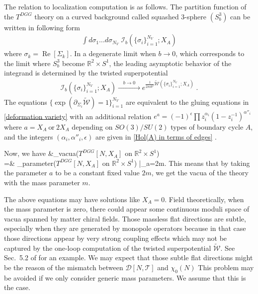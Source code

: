 \documentclass[a4paper,11pt]{article}
\def\cT{\mathcal{T}}
\def\cD{\mathcal{D}}
\def\Re{\mathop{\mathrm{Re}}}
\def\beq#1\eeq{\begin{align}#1\end{align}}
\def\alert#1{{\color{red}[#1]}}
\begin{document}
The relation to localization computation is as follows. The partition function of the $T^{DGG}$ theory on a curved background called squashed 3-sphere 
$(S^3_b)$ can be written in  following form \cite{Hama:2011ea,Dimofte:2011ju}
%
\begin{align}
\int d\sigma_1 \ldots d\sigma_{N_V} \;\mathcal{I}_b( \{\sigma_i\}_{i=1}^{N_V}  ;X_A) 
\end{align}
%
where $\sigma_k = \Re[\Sigma_k]$.
In a degenerate limit when $b\rightarrow 0$, which corresponds to the limit where $S^3_b$ become $\mathbb{R}^2 \times S^1$, the leading asymptotic behavior of the integrand is determined by the twisted superpotential 
%
\begin{align}
\mathcal{I}_b (  \{\sigma_i\}_{i=1}^{N_V} ;X_A)  \xrightarrow[]{\quad b\rightarrow 0 \quad }  
e^{\frac{1}{2\pi i b^2} \widetilde{\mathcal{W}}(  \{\sigma_i\}_{i=1}^{N_V} ;X_A) }\;.
\end{align}
%
The  equations $\{ \exp (\partial_{\Sigma_i}\widetilde{\mathcal{W}})=1\}_{i=1}^{N_V}$ are equivalent 
to the gluing equations in \eqref{deformation variety} 
with an additional relation $e^{a}=(-1)^{\epsilon}\prod z_i^{\alpha_i} (1-z_i^{-1})^{\alpha''_i}$ where $a=X_A~\text{or}~2X_A$ depending on $SO(3)/SU(2)$ types of boundary cycle $A$,
and the integers $(\alpha_i, \alpha''_i,\epsilon)$ are given in \eqref{Hol(A) in terms of edges} \cite{Dimofte:2012qj}. 

Now, we have
\beq
&_{\rm vacua}(\textrm{$T^{DGG}[N,X_A]$ on $\mathbb{R}^2\times S^1$})  \nonumber \\
=& _{\rm parameter}(\textrm{$T^{DGG}[N,X_A]$ on $\mathbb{R}^2\times S^1$}) |_{a=2m}. \label{eq:DGGvacua}
\eeq
This means that by taking the parameter $a$ to be a constant fixed value $2m$, we get the vacua of the theory with the mass parameter $m$.

The above equations may have solutions like $X_A=0$. Field theoretically, when the mass parameter is zero,
there could appear some continuous moduli space of vacua spanned by matter chiral fields. Those massless flat directions are subtle, especially when they are generated by
monopole operators because in that case those directions appear by very strong coupling effects which may not be captured by the one-loop computation of 
the twisted superpotential $\widetilde{\mathcal{W}}$. See Sec.~5.2 of \cite{Dimofte:2011ju} for an example.
We may expect that those subtle flat directions might be the reason of the mismatch between $\cD[N,\cT] $ and $\chi_0(N)$
This problem may be avoided if we only consider generic mass parameters. We assume that this is the case.
\end{document}
